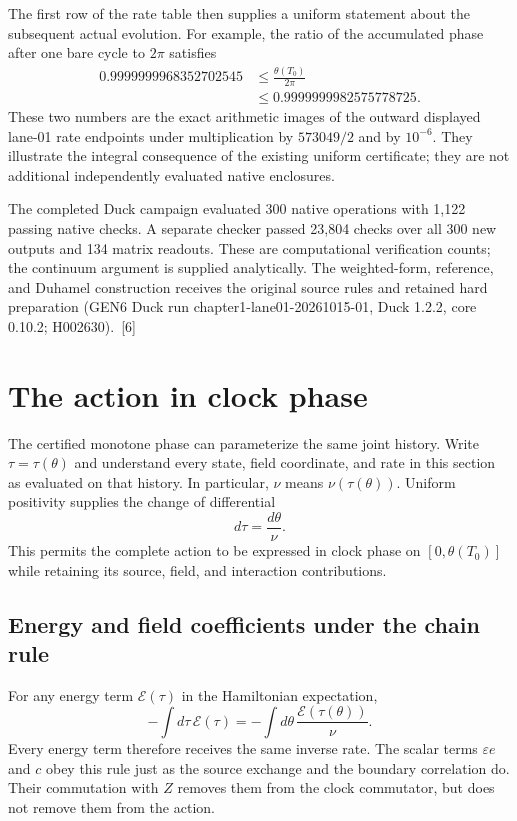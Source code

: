 \documentclass[10pt,twocolumn,letterpaper]{article}
\begin{document}
The first row of the rate table then supplies a uniform statement about the subsequent actual evolution. For example, the ratio of the accumulated phase after one bare cycle to $2\pi$ satisfies
\[
\begin{aligned}
0.9999999968352702545
&\le\frac{\theta(T_0)}{2\pi}\\
&\le0.9999999982575778725.
\end{aligned}
\]
These two numbers are the exact arithmetic images of the outward displayed lane-01 rate endpoints under multiplication by $573049/2$ and by $10^{-6}$. They illustrate the integral consequence of the existing uniform certificate; they are not additional independently evaluated native enclosures.

The completed Duck campaign evaluated 300 native operations with 1,122 passing native checks. A separate checker passed 23,804 checks over all 300 new outputs and 134 matrix readouts. These are computational verification counts; the continuum argument is supplied analytically. The weighted-form, reference, and Duhamel construction receives the original source rules and retained hard preparation (GEN6 Duck run chapter1-lane01-20261015-01, Duck 1.2.2, core 0.10.2; H002630).~[6]

\section{The action in clock phase}
The certified monotone phase can parameterize the same joint history. Write $\tau=\tau(\theta)$ and understand every state, field coordinate, and rate in this section as evaluated on that history. In particular, $\nu$ means $\nu(\tau(\theta))$. Uniform positivity supplies the change of differential
\[
d\tau=\frac{d\theta}{\nu}.
\]
This permits the complete action to be expressed in clock phase on $[0,\theta(T_0)]$ while retaining its source, field, and interaction contributions.

\subsection{Energy and field coefficients under the chain rule}
For any energy term $\mathcal E(\tau)$ in the Hamiltonian expectation,
\[
-\int d\tau\,\mathcal E(\tau)
=-\int d\theta\,\frac{\mathcal E(\tau(\theta))}{\nu}.
\]
Every energy term therefore receives the same inverse rate. The scalar terms $\varepsilon e$ and $c$ obey this rule just as the source exchange and the boundary correlation do. Their commutation with $Z$ removes them from the clock commutator, but does not remove them from the action.
\end{document}
